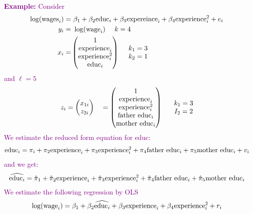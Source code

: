 \documentclass[a4paper,twoside,11pt]{article}
\begin{document}
\textcolor{Purple}{
\textbf{Example:}
\newline
\newline
Consider
\begin{equation*}
\begin{aligned}
\log (\textmd{wages}_i) =& \  \beta_1 + \beta_2 \textmd{educ}_i + \beta_3 \textmd{expereince}_i + \beta_4 \textmd{experience}_i^2 + e_i \\
y_i =& \  \log(\textmd{wage}_i) \ \ \ \ k =4 \\
x_i =& \begin{pmatrix}
1 \\
\textmd{experience}_i \\
\textmd{experience}_i^2 \\
\textmd{educ}_i
\end{pmatrix} \ \ \ \ \begin{matrix}
k_1 =3 \\
k_2 =1
\end{matrix}
\end{aligned} 
\end{equation*}
and $\ell =5$
\begin{equation*}
\begin{aligned}
z_i = \begin{pmatrix}
x_{1i} \\ z_{2i}
\end{pmatrix} \ \ \ = \begin{pmatrix}
1 \\
\textmd{experience}_i \\
\textmd{experience}_i^2 \\
\textmd{father educ}_i \\
\textmd{mother educ}_i
\end{pmatrix} \ \ \ \ \ \begin{matrix}
k_1 =3 \\
I_2 = 2
\end{matrix}
\end{aligned} 
\end{equation*}
We estimate the reduced form equation for educ:
\begin{equation*}
\begin{aligned}
\textmd{educ}_i = \pi_i + \pi_2 \textmd{experience}_i + \pi_3 \textmd{experience}_i^2 + \pi_4 \textmd{father educ}_i + \pi_5 \textmd{mother educ}_i + v_i
\end{aligned} 
\end{equation*}
and we get:
\begin{equation*}
\begin{aligned}
\widehat{\textmd{educ}_i} = \hat{\pi}_1 + \hat{\pi}_2 \textmd{experience}_i + \hat{\pi}_3 \textmd{experience}_i^2 + \hat{\pi}_4 \textmd{father educ}_i + \hat{\pi}_5 \textmd{mother educ}_i
\end{aligned} 
\end{equation*}
We estimate the following regression by OLS
\begin{equation*}
\begin{aligned}
\log (\textmd{wage}_i) = \beta_1 + \beta_2 \widehat{\textmd{educ}_i} + \beta_3 \textmd{experience}_i + \beta_4 \textmd{experience}_i^2 + r_i
\end{aligned} 
\end{equation*}}
\end{document}
